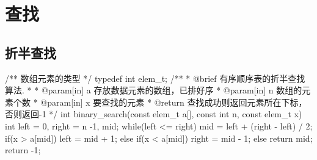 \chapter{查找}

\section{折半查找} %

\begin{Codex}[label=binary_search.c]
/** 数组元素的类型 */
typedef int elem_t;
/**
  * @brief 有序顺序表的折半查找算法.
  *
  * @param[in] a 存放数据元素的数组，已排好序
  * @param[in] n 数组的元素个数
  * @param[in] x 要查找的元素
  * @return 查找成功则返回元素所在下标，否则返回-1
  */
int binary_search(const elem_t a[], const int n, const elem_t x) {
    int left = 0, right = n -1, mid;
    while(left <= right) {
        mid = left + (right - left) / 2;
        if(x > a[mid]) {
            left = mid + 1;
        } else if(x < a[mid]) {
            right = mid - 1;
        } else {
            return mid;
        }
    }
    return -1;
}
\end{Codex}
